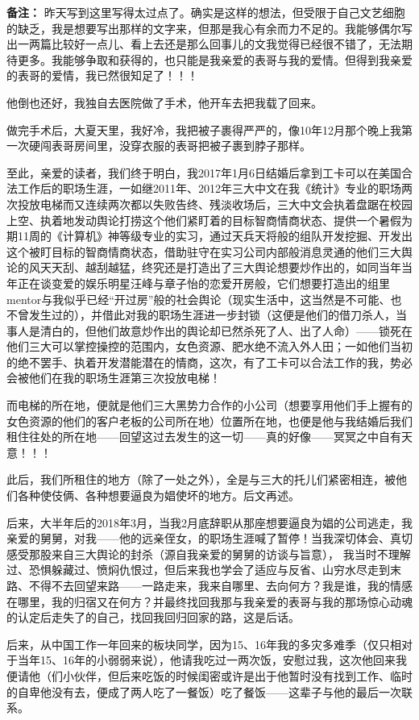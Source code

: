 \documentclass[9pt, b5paper]{article}
\begin{document}
\textbf{备注：} 昨天写到这里写得太过点了。确实是这样的想法，但受限于自己文艺细胞的缺乏，我是想要写出那样的文字来，但那是我心有余而力不足的。我能够偶尔写出一两篇比较好一点儿、看上去还是那么回事儿的文我觉得已经很不错了，无法期待更多。我能够争取和获得的，也只能是我亲爱的表哥与我的爱情。但得到我亲爱的表哥的爱情，我已然很知足了！！！

他倒也还好，我独自去医院做了手术，他开车去把我载了回来。

做完手术后，大夏天里，我好冷，我把被子裹得严严的，像10年12月那个晚上我第一次硬闯表哥房间里，没穿衣服的表哥把被子裹到脖子那样。

至此，亲爱的读者，我们终于明白，我2017年1月6日结婚后拿到工卡可以在美国合法工作后的职场生涯，一如继2011年、2012年三大中文在我《统计》专业的职场两次投放电梯而又连续两次都以失败告终、残淡收场后，三大中文会执着盘踞在校园上空、执着地发动舆论打捞这个他们紧盯着的目标智商情商状态、提供一个暑假为期11周的《计算机》神等级专业的实习，通过天兵天将般的组队开发挖掘、开发出这个被盯目标的智商情商状态，借助驻守在实习公司内部般消息灵通的他们三大舆论的风天天刮、越刮越猛，终究还是打造出了三大舆论想要炒作出的，如同当年当年正在谈变爱的娱乐明星汪峰与章子怡的恋爱开房般，它们想要打造出的组里mentor与我似乎已经“开过房”般的社会舆论（现实生活中，这当然是不可能、也不曾发生过的），并借此对我的职场生涯进一步封锁（这便是他们的借刀杀人，当事人是清白的，但他们故意炒作出的舆论却已然杀死了人、出了人命）——锁死在他们三大可以掌控操控的范围内，女色资源、肥水绝不流入外人田；一如他们当初的绝不罢手、执着开发潜能潜在的情商，这次，有了工卡可以合法工作的我，势必会被他们在我的职场生涯第三次投放电梯！

而电梯的所在地，便就是他们三大黑势力合作的小公司（想要享用他们手上握有的女色资源的他们的客户老板的公司所在地）位置所在地，也便是他与我结婚后我们租住往处的所在地——回望这过去发生的这一切——真的好像——冥冥之中自有天意！！！

此后，我们所租住的地方（除了一处之外），全是与三大的托儿们紧密相连，被他们各种使伎俩、各种想要逼良为娼使坏的地方。后文再述。

后来，大半年后的2018年3月，当我2月底辞职从那座想要逼良为娼的公司逃走，我亲爱的舅舅，对我——他的远亲侄女，的职场生涯喊了暂停！当我深切体会、真切感受那股来自三大舆论的封杀（源自我亲爱的舅舅的访谈与旨意），
我当时不理解过、恐惧躲藏过、愤焖仇恨过，但后来我也学会了适应与反省、山穷水尽走到末路、不得不去回望来路——一路走来，我来自哪里、去向何方？我是谁，我的情感在哪里，我的归宿又在何方？并最终找回我那与我亲爱的表哥与我的那场惊心动魂的认定后走失了的自己，找回我回归回家的路，这是后话。

后来，从中国工作一年回来的板块同学，因为15、16年我的多灾多难季（仅只相对于当年15、16年的小弱弱来说），他请我吃过一两次饭，安慰过我，这次他回来我便请他（们小伙伴，但后来吃饭的时候闺密或许是出于他暂时没有找到工作、临时的自卑他没有去，便成了两人吃了一餐饭）吃了餐饭——这辈子与他的最后一次联系。
\end{document}
